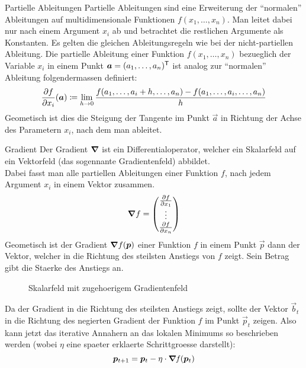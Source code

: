 \begin{defbox}{Partielle Ableitungen}\label{ref:partielle_ableitungen}
  Partielle Ableitungen sind eine Erweiterung der ``normalen'' Ableitungen auf multidimensionale Funktionen $f(x_1,\ldots,x_n)$.
  Man leitet dabei nur nach einem Argument $x_i$ ab und betrachtet die restlichen Argumente als Konstanten.
  Es gelten die gleichen Ableitungsregeln wie bei der nicht-partiellen Ableitung.
  Die partielle Ableitung einer Funktion $f(x_1,\ldots,x_n)$ bezueglich der Variable $x_i$ in einem Punkt $\bm{a}=(a_1,\ldots,a_n)^{\mathsf{T}}$ ist analog zur ``normalen'' Ableitung folgendermassen definiert:
  \begin{equation*}
    \frac{\partial f}{\partial x_i}(\bm{a}) \coloneqq \lim_{h \to 0} \frac{f(a_1,\ldots,a_i + h,\ldots,a_n)-f(a_1,\ldots,a_i,\ldots,a_n)}{h}
  \end{equation*}
  Geometisch ist dies die Steigung der Tangente im Punkt $\vec{a}$ in Richtung der Achse des Parametern $x_i$, nach dem man ableitet.
\end{defbox}

\para{}

\begin{defbox}{Gradient}
  Der Gradient $\bm{\nabla}$ ist ein Differentialoperator, welcher ein Skalarfeld auf ein Vektorfeld (das sogennante Gradientenfeld) abbildet.\\
  Dabei fasst man alle partiellen Ableitungen einer Funktion $f$, nach jedem
  Argument $x_i$ in einem Vektor zusammen.
  \begin{equation*}
    \bm{\nabla}f=
    \begin{pmatrix}
      \frac{\partial f}{\partial x_1} \\
      \vdots \\
      \frac{\partial f}{\partial x_n} \\
    \end{pmatrix}
  \end{equation*}
  Geometisch ist der Gradient $\bm{\nabla}f(\bm{p})$ einer Funktion $f$ in einem Punkt $\vec{p}$ dann der Vektor, welcher in die Richtung des steilsten Anstiegs von $f$ zeigt.
  Sein Betrag gibt die Staerke des Anstiegs an.



\end{defbox}

\begin{figure}[h!]
  \caption{Skalarfeld mit zugehoerigem Gradientenfeld}
\end{figure}

Da der Gradient in die Richtung des steilsten Anstiegs zeigt, sollte der Vektor $\vec{b}_t$ in die Richtung des negierten Gradient der Funktion $f$ im Punkt $\vec{p}_t$ zeigen.
Also kann jetzt das iterative Annahern an das lokalen Minimums so beschrieben
werden (wobei $\eta$ eine spaeter erklaerte Schrittgroesse darstellt):\\
\begin{equation}\label{eq:gradientdescent}
  \bm{p}_{t+1} = \bm{p}_t - \eta \cdot \bm{\nabla} \mathit{f}(\bm{p}_t)
\end{equation}

